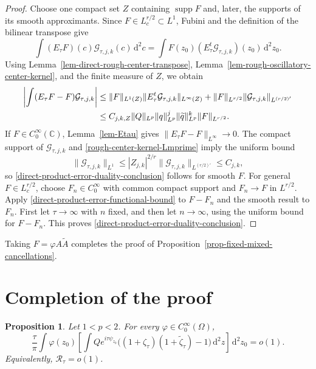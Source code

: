 \documentclass[a4paper,11pt]{article}
\newcommand{\C}{\mathbb{C}}
\newcommand{\dd}{\,\text{d}}
\theoremstyle{plain}
\newtheorem{prop}[thm]{Proposition}
\theoremstyle{definition}
\theoremstyle{remark}
\begin{document}
\begin{proof}
Choose one compact set $Z$ containing $\operatorname{supp}F$ and, later,
the supports of its smooth approximants.  Since $F\in L^{r/2}_c\subset L^1$,
Fubini and the definition of the bilinear transpose
give
\begin{equation}\label{direct-product-error-transpose-pairing}
 \int (E_\tau F)(c)\mathcal G_{\tau,j,k}(c)\dd^2c
 =\int F(z_0)(E_\tau^t\mathcal G_{\tau,j,k})(z_0)\dd^2z_0.
\end{equation}
Using Lemma~\ref{lem-direct-rough-center-transpose},
Lemma~\ref{lem-rough-oscillatory-center-kernel}, and the finite measure of
$Z$, we obtain
\begin{align}
 \left|\int(E_\tau F-F)\mathcal G_{\tau,j,k}\right|
 &\leq \|F\|_{L^1(Z)}
       \|E_\tau^t\mathcal G_{\tau,j,k}\|_{L^\infty(Z)}
       +\|F\|_{L^{r/2}}\|\mathcal G_{\tau,j,k}\|_{L^{(r/2)'}}\notag\\
 &\leq C_{j,k,Z}
 \|Q\|_{L^p}\|q\|_{L^p}^j\|\widetilde q\|_{L^p}^k
 \|F\|_{L^{r/2}}.
 \label{direct-product-error-functional-bound}
\end{align}
If $F\in C_0^\infty(\C)$, Lemma~\ref{lem-Etau} gives
$\|E_\tau F-F\|_{L^\infty}\to0$.  The compact support of
$\mathcal G_{\tau,j,k}$ and \eqref{rough-center-kernel-Lmprime} imply the uniform bound
\[
 \|\mathcal G_{\tau,j,k}\|_{L^1}
 \leq |Z_{j,k}|^{2/r}\|\mathcal G_{\tau,j,k}\|_{L^{(r/2)'}}\leq C_{j,k},
\]
so \eqref{direct-product-error-duality-conclusion} follows for smooth $F$.
For general $F\in L^{r/2}_c$, choose $F_n\in C_0^\infty$ with common compact support and $F_n\to F$ in $L^{r/2}$. Apply \eqref{direct-product-error-functional-bound} to $F-F_n$ and the smooth result to $F_n$. First let $\tau\to\infty$ with $n$ fixed, and then let $n\to\infty$, using the uniform bound for $F-F_n$. This proves \eqref{direct-product-error-duality-conclusion}.
\end{proof}

Taking $F=\varphi A\widetilde A$ completes the proof of Proposition~\ref{prop-fixed-mixed-cancellations}.


\section{Completion of the proof}\label{sec:final-proof}\label{subsec-completion-remainder}

\begin{prop}\label{prop-Lp-remainders}
Let $1<p<2$.  For every $\varphi\in C_0^\infty(\Omega)$,
\begin{equation}\label{Lp-remainder-estimate}
\frac{\tau}{\pi}\int\varphi(z_0)
\left[
\int Qe^{i\tau\psi_{z_0}}
\bigl((1+\zeta_\tau)(1+\widetilde\zeta_\tau)-1\bigr)\dd^2z
\right]\dd^2z_0=o(1).
\end{equation}
Equivalently, $\mathcal R_\tau=o(1)$.
\end{prop}
\end{document}
